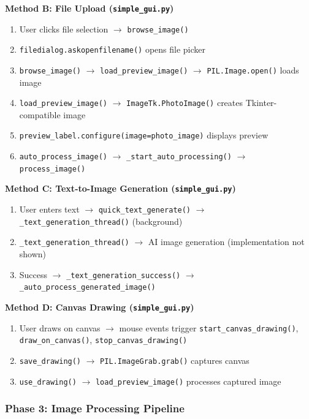 \documentclass[a4paper,12pt]{article}
\begin{document}
\textbf{Method B: File Upload (\texttt{simple\_gui.py})}
\begin{enumerate}
\item User clicks file selection $\rightarrow$ \texttt{browse\_image()}
\item \texttt{filedialog.askopenfilename()} opens file picker
\item \texttt{browse\_image()} $\rightarrow$ \texttt{load\_preview\_image()} $\rightarrow$ \texttt{PIL.Image.open()} loads image
\item \texttt{load\_preview\_image()} $\rightarrow$ \texttt{ImageTk.PhotoImage()} creates Tkinter-compatible image
\item \texttt{preview\_label.configure(image=photo\_image)} displays preview
\item \texttt{auto\_process\_image()} $\rightarrow$ \texttt{\_start\_auto\_processing()} $\rightarrow$ \texttt{process\_image()}
\end{enumerate}

\textbf{Method C: Text-to-Image Generation (\texttt{simple\_gui.py})}
\begin{enumerate}
\item User enters text $\rightarrow$ \texttt{quick\_text\_generate()} $\rightarrow$ \texttt{\_text\_generation\_thread()} (background)
\item \texttt{\_text\_generation\_thread()} $\rightarrow$ AI image generation (implementation not shown)
\item Success $\rightarrow$ \texttt{\_text\_generation\_success()} $\rightarrow$ \texttt{\_auto\_process\_generated\_image()}
\end{enumerate}

\textbf{Method D: Canvas Drawing (\texttt{simple\_gui.py})}
\begin{enumerate}
\item User draws on canvas $\rightarrow$ mouse events trigger \texttt{start\_canvas\_drawing()}, \texttt{draw\_on\_canvas()}, \texttt{stop\_canvas\_drawing()}
\item \texttt{save\_drawing()} $\rightarrow$ \texttt{PIL.ImageGrab.grab()} captures canvas
\item \texttt{use\_drawing()} $\rightarrow$ \texttt{load\_preview\_image()} processes captured image
\end{enumerate}

\subsubsection{Phase 3: Image Processing Pipeline}
\end{document}
